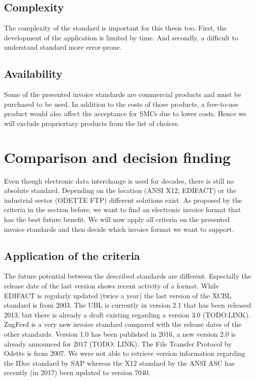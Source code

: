 \subsection{Complexity}
\label{sec2.2.5}
The complexity of the standard is important for this thesis too. First, the development of the application is limited by time. And secondly, a difficult to understand standard more error-prone.

\subsection{Availability}
\label{sec2.2.6}

Some of the presented invoice standards are commercial products and must be purchased to be used. In addition to the costs of those products, a free-to-use product would also affect the acceptance for SMCs due to lower costs. Hence we will exclude propriertary products from the list of choices. 

\section{Comparison and decision finding}
\label{sec2.3}

Even though electronic data interchange is used for decades, there is still no absolute standard. Depending on the location (ANSI X12, EDIFACT) or the industrial sector (ODETTE FTP) different solutions exist. As proposed by the criteria in the section before, we want to find an electronic invoice format that has the best future benefit. We will now apply all criteria on the presented invoice standards and then decide which invoice format we want to support.

\subsection{Application of the criteria}
\label{sec2.3.1}

The future potential between the described standards are different. Especially the release date of the last version shows recent activity of a format. While EDIFACT is regularly updated (twice a year) the last version of the XCBL standard is from 2003. The UBL is currently in version 2.1 that has been released 2013, but there is already a draft existing regarding a version 3.0 (TODO:LINK). ZugFerd is a very new invoice standard compared with the release dates of the other standards. Version 1.0 has been published in 2016, a new version 2.0 is already announced for 2017 (TODO: LINK). The File Transfer Protocol by Odette is from 2007. We were not able to retrieve version information regarding the IDoc standard by SAP whereas the X12 standard by the ANSI ASC has recently (in 2017) been updated to version 7040.


